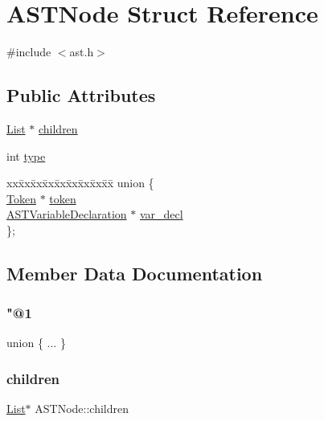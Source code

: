 \hypertarget{structASTNode}{}\section{A\+S\+T\+Node Struct Reference}
\label{structASTNode}


{\ttfamily \#include $<$ast.\+h$>$}

\subsection*{Public Attributes}
\begin{DoxyCompactItemize}
\item 
\hyperlink{structList}{List} $\ast$ \hyperlink{structASTNode_a435c2e2c65af90b9be825f1e486a8be8}{children}
\item 
int \hyperlink{structASTNode_a511b8dc176b14b334d4bf6dddc84ca32}{type}
\item 
\begin{tabbing}
xx\=xx\=xx\=xx\=xx\=xx\=xx\=xx\=xx\=\kill
union \{\\
\>\hyperlink{structToken}{Token} $\ast$ \hyperlink{structASTNode_a21259aab48ee3cf3e50dcd7c68c347b6}{token}\\
\>\hyperlink{structASTVariableDeclaration}{ASTVariableDeclaration} $\ast$ \hyperlink{structASTNode_a15d33dae46f38a469b189522ff24ed38}{var\_decl}\\
\}; \\

\end{tabbing}\end{DoxyCompactItemize}


\subsection{Member Data Documentation}
\hypertarget{structASTNode_a8484cf2267c4d4b2c43e6162b6aed150}{}\label{structASTNode_a8484cf2267c4d4b2c43e6162b6aed150} 
\subsubsection{\texorpdfstring{"@1}{@1}}
{\footnotesize\ttfamily union \{ ... \} }

\hypertarget{structASTNode_a435c2e2c65af90b9be825f1e486a8be8}{}\label{structASTNode_a435c2e2c65af90b9be825f1e486a8be8} 
\subsubsection{\texorpdfstring{children}{children}}
{\footnotesize\ttfamily \hyperlink{structList}{List}$\ast$ A\+S\+T\+Node\+::children}


